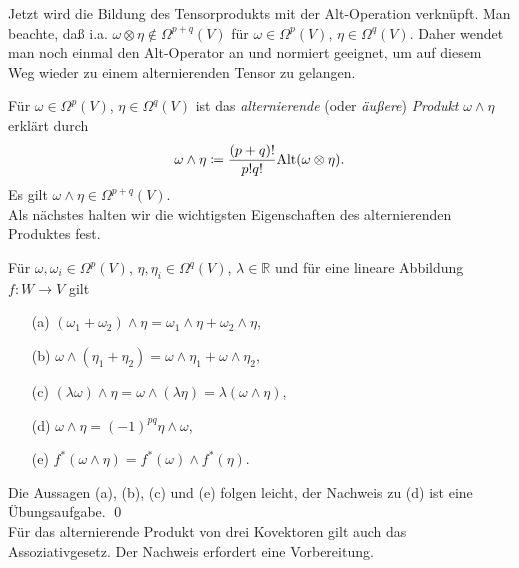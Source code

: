 \documentclass[a4paper,twoside,DIV15,BCOR12mm]{scrbook}
\begin{document}
\noindent
Jetzt wird die Bildung des Tensorprodukts mit der Alt-Operation 
verknüpft. Man beachte, daß i.a. $\omega \otimes \eta \notin 
\Omega^{p+q}(V)$ für $\omega \in \Omega^{p}(V)$, $\eta \in 
\Omega^{q}(V)$. Daher wendet man noch einmal den Alt-Operator an und 
normiert geeignet, um auf diesem Weg wieder zu einem alternierenden Tensor 
zu gelangen.

\bigskip

 Für $\omega \in \Omega^{p}(V)$, $\eta 
\in \Omega^{q}(V)$ ist das {\em alternierende} (oder {\em äußere}) 
{\em Produkt} $\omega \wedge \eta$ erklärt durch
\[ \omega \wedge \eta \da  \frac{(p+q)!}{p!q!} {\rm Alt}(\omega \otimes 
\eta). \]
Es gilt $\omega \wedge \eta \in \Omega^{p+q}(V)$.\\


\noindent Als nächstes halten wir die wichtigsten Eigenschaften des 
alternierenden Produktes fest.\\



\begin{satz}\label{Satz3.3.3} {Für $\omega, \omega_{i} \in 
\Omega^{p}(V)$, $\eta, \eta_{i} \in \Omega^{q}(V)$, $\lambda \in 
{\mathbb R}$ und für eine lineare Abbildung $f: W \to V$ gilt}
\begin{enumerate}
\item[{\rm (a)}] $(\omega_{1} + \omega_{2}) \wedge \eta = \omega_{1} \wedge 
\eta + \omega_{2} \wedge \eta$,
\item[{\rm (b)}] $\omega \wedge (\eta_{1} + \eta_{2}) = \omega \wedge \eta_{1} + 
\omega \wedge \eta_{2}$, 
\item[{\rm (c)}] $(\lambda \omega) \wedge \eta = \omega \wedge (\lambda \eta) = 
\lambda(\omega \wedge \eta)$,
\item[{\rm (d)}] $\omega \wedge \eta = (-1)^{pq} \eta \wedge \omega$,
\item[{\rm (e)}] $f^{*}(\omega \wedge \eta) = f^{*}(\omega) \wedge f^{*}(\eta)$.
\end{enumerate}
\end{satz}

\bigskip

 Die Aussagen (a), (b), (c) und (e) folgen 
leicht, der Nachweis zu (d) ist eine Übungsaufgabe. \qed\\

\noindent
Für das alternierende Produkt von drei Kovektoren gilt auch das 
Assoziativgesetz. Der Nachweis erfordert eine Vorbereitung.
\end{document}
